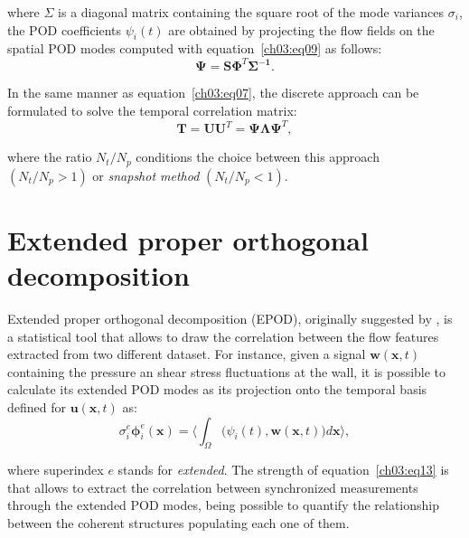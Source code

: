 \noindent where $\Sigma$ is a diagonal matrix containing the square root of the mode variances $\sigma_i$, the POD coefficients $\psi_i(t)$ are obtained by projecting the flow fields on the spatial POD modes computed with equation~\ref{ch03:eq09} as follows:
\begin{equation}
  \mathbf{\Psi} =  \mathbf{S} \mathbf{\Phi}^T\mathbf{\Sigma^{-1}}.
  \label{ch03:eq11}
\end{equation}

In the same manner as equation~\ref{ch03:eq07}, the discrete approach can be formulated to solve the temporal correlation matrix:
\begin{equation}
    \mathbf{T}=\mathbf{U}\mathbf{U}^T=\boldsymbol{\Psi}\boldsymbol{\Lambda}\boldsymbol{\Psi}^T,
    \label{ch03:eq12}
\end{equation}

\noindent where the ratio $N_t/N_p$ conditions the choice between this approach $(N_t/N_p>1)$ or \textit{snapshot method} $(N_t/N_p<1)$.

\section{Extended proper orthogonal decomposition}\label{ch03:s3}

Extended proper orthogonal decomposition (EPOD), originally suggested by \citet{maurel2001extended}, is a statistical tool that allows to draw the correlation between the flow features extracted from two different dataset. For instance, given a signal $\boldsymbol{w}(\boldsymbol{x}, t)$ containing the pressure an shear stress fluctuations at the wall, it is possible to calculate its extended POD modes as its projection onto the temporal basis defined for $\boldsymbol{u}(\boldsymbol{x}, t)$ as:
\begin{equation}
  \sigma_i^e\boldsymbol{\phi}_i^e(\boldsymbol{x})=\biggl\langle\int_{\Omega} \bigl(\psi_i(t),\boldsymbol{w}(\boldsymbol{x}, t)\bigl)d\boldsymbol{x}\biggl\rangle,
  \label{ch03:eq13}
\end{equation}

\noindent where superindex $e$ stands for \textit{extended}.
The strength of equation~\ref{ch03:eq13} is that allows to extract the correlation between synchronized measurements through the extended POD modes, being possible to quantify the relationship between the coherent structures populating each one of them.

